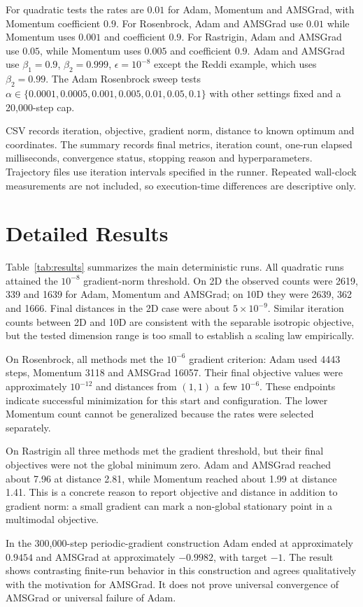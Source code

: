\documentclass[conference]{IEEEtran}
\begin{document}
For quadratic tests the rates are $0.01$ for Adam, Momentum and AMSGrad, with Momentum coefficient $0.9$. For Rosenbrock, Adam and AMSGrad use $0.01$ while Momentum uses $0.001$ and coefficient $0.9$. For Rastrigin, Adam and AMSGrad use $0.05$, while Momentum uses $0.005$ and coefficient $0.9$. Adam and AMSGrad use $\beta_1=0.9$, $\beta_2=0.999$, $\epsilon=10^{-8}$ except the Reddi example, which uses $\beta_2=0.99$. The Adam Rosenbrock sweep tests $\alpha\in\{0.0001,0.0005,0.001,0.005,0.01,0.05,0.1\}$ with other settings fixed and a 20,000-step cap.

CSV records iteration, objective, gradient norm, distance to known optimum and coordinates. The summary records final metrics, iteration count, one-run elapsed milliseconds, convergence status, stopping reason and hyperparameters. Trajectory files use iteration intervals specified in the runner. Repeated wall-clock measurements are not included, so execution-time differences are descriptive only.
\section{Detailed Results}
Table~\ref{tab:results} summarizes the main deterministic runs. All quadratic runs attained the $10^{-8}$ gradient-norm threshold. On 2D the observed counts were 2619, 339 and 1639 for Adam, Momentum and AMSGrad; on 10D they were 2639, 362 and 1666. Final distances in the 2D case were about $5\times10^{-9}$. Similar iteration counts between 2D and 10D are consistent with the separable isotropic objective, but the tested dimension range is too small to establish a scaling law empirically.

On Rosenbrock, all methods met the $10^{-6}$ gradient criterion: Adam used 4443 steps, Momentum 3118 and AMSGrad 16057. Their final objective values were approximately $10^{-12}$ and distances from $(1,1)$ a few $10^{-6}$. These endpoints indicate successful minimization for this start and configuration. The lower Momentum count cannot be generalized because the rates were selected separately.

On Rastrigin all three methods met the gradient threshold, but their final objectives were not the global minimum zero. Adam and AMSGrad reached about 7.96 at distance 2.81, while Momentum reached about 1.99 at distance 1.41. This is a concrete reason to report objective and distance in addition to gradient norm: a small gradient can mark a non-global stationary point in a multimodal objective.

In the 300,000-step periodic-gradient construction Adam ended at approximately $0.9454$ and AMSGrad at approximately $-0.9982$, with target $-1$. The result shows contrasting finite-run behavior in this construction and agrees qualitatively with the motivation for AMSGrad. It does not prove universal convergence of AMSGrad or universal failure of Adam.
\end{document}
